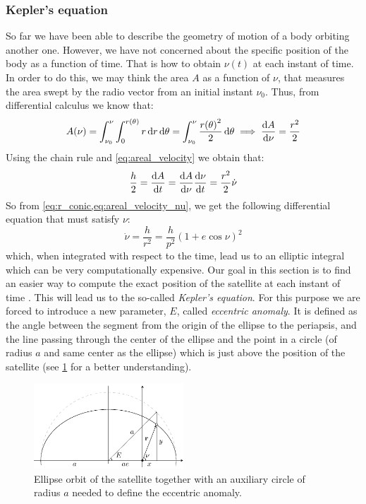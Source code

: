 \documentclass[../main.tex]{subfiles}
\begin{document}
\subsubsection{Kepler's equation}\label{sec:kepler_equation}
So far we have been able to describe the geometry of motion of a body orbiting another one. However, we have not concerned about the specific position of the body as a function of time. That is how to obtain $\nu(t)$ at each instant of time. In order to do this, we may think the area $A$ as a function of $\nu$, that measures the area swept by the radio vector from an initial instant $\nu_0$. Thus, from differential calculus we know that:
\begin{equation}
  A(\nu)=\int_{\nu_0}^{\nu}\int_{0}^{r(\theta)}r\dd{r}\dd{\theta}=\int_{\nu_0}^{\nu}\frac{{r(\theta)}^2}{2}\dd{\theta}\implies\dv{A}{\nu}=\frac{r^2}{2}
\end{equation}
Using the chain rule and \cref{eq:areal_velocity} we obtain that:
\begin{equation}\label{eq:areal_velocity_nu}
  \frac{h}{2}=\dv{A}{t}=\dv{A}{\nu}\dv{\nu}{t}=\frac{r^2}{2}\dot\nu
\end{equation}
So from \cref{eq:r_conic,eq:areal_velocity_nu}, we get the following differential equation that must satisfy $\nu$:
\begin{equation}
  \dot\nu=\frac{h}{r^2}=\frac{h}{p^2}{(1+e\cos\nu)}^2
\end{equation}
which, when integrated with respect to the time, lead us to an elliptic integral which can be very computationally expensive. Our goal in this section is to find an easier way to compute the exact position of the satellite at each instant of time \cite{montenbruck}. This will lead us to the so-called \emph{Kepler's equation}. For this purpose we are forced to introduce a new parameter, $E$, called \emph{eccentric anomaly}. It is defined as the angle between the segment from the origin of the ellipse to the periapsis, and the line passing through the center of the ellipse and the point in a circle (of radius $a$ and same center as the ellipse) which is just above the position of the satellite (see \cref{fig:kepler_eq} for a better understanding).
\begin{figure}[ht]
  \centering
  \includegraphics[width=0.5\textwidth]{Images/kepler_eq.pdf}
  \caption{Ellipse orbit of the satellite together with an auxiliary circle of radius $a$ needed to define the eccentric anomaly.}
  \label{fig:kepler_eq}
\end{figure}
\end{document}
